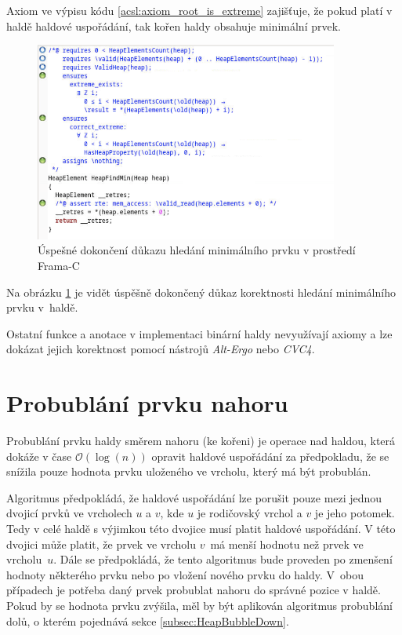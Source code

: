 Axiom ve výpisu kódu \ref{acsl:axiom_root_is_extreme} zajišťuje, že pokud platí v haldě haldové uspořádání, tak kořen haldy obsahuje minimální prvek.

\begin{figure}[H]
	\centering
	\includegraphics[width=10cm]{images/frama-c-HeapFindMin}
	\caption{Úspešné dokončení důkazu hledání minimálního prvku v prostředí Frama-C}
	\label{img:F-C-HeapFindMin}
\end{figure}

Na obrázku \ref{img:F-C-HeapFindMin} je vidět úspěšně dokončený důkaz korektnosti hledání minimálního prvku v~haldě.

Ostatní funkce a anotace v implementaci binární haldy nevyužívají axiomy a lze dokázat jejich korektnost pomocí nástrojů \mbox{\textit{Alt-Ergo}} nebo \textit{CVC4}.

\section{Probublání prvku nahoru}
\label{subsec:HeapBubbleUp}

Probublání prvku haldy směrem nahoru (ke kořeni) je operace nad haldou, která dokáže v čase $\mathcal{O}(\log(n))$ opravit haldové uspořádání za předpokladu, že se snížila pouze hodnota prvku uloženého ve vrcholu, který má být probublán.

Algoritmus předpokládá, že haldové uspořádání lze porušit pouze mezi jednou dvojicí prvků ve vrcholech $u$ a $v$, kde $u$ je rodičovský vrchol a $v$ je jeho potomek. Tedy v celé haldě s výjimkou této dvojice musí platit haldové uspořádání. V této dvojici může platit, že prvek ve vrcholu $v$~má menší hodnotu než prvek ve vrcholu~$u$. Dále se předpokládá, že tento algoritmus bude proveden po zmenšení hodnoty některého prvku nebo po vložení nového prvku do haldy. V~obou případech je potřeba daný prvek probublat nahoru do správné pozice v haldě. Pokud by se hodnota prvku zvýšila, měl by být aplikován algoritmus probublání dolů, o kterém pojednává sekce \ref{subsec:HeapBubbleDown}.

